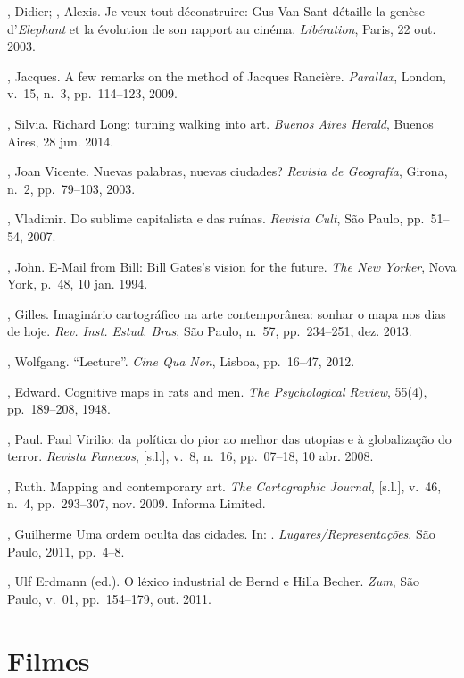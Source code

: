 \begin{bibliohedra}
, Didier; , Alexis. Je veux tout déconstruire: Gus Van Sant
détaille la genèse d'\emph{Elephant} et la évolution de son rapport au
cinéma. \emph{Libération}, Paris, 22 out. 2003.

, Jacques. A few remarks on the method of Jacques Rancière.
\emph{Parallax}, London, v.~15, n.~3, pp.~114--123, 2009. 

, Silvia. Richard Long: turning walking into art.
\emph{Buenos Aires Herald}, Buenos Aires, 28 jun. 2014.

, Joan Vicente. Nuevas palabras, nuevas ciudades? \emph{Revista
de Geografía}, Girona, n.~2, pp.~79--103, 2003.

, Vladimir. Do sublime capitalista e das ruínas. \emph{Revista
Cult}, São Paulo, pp.~51--54, 2007.

, John. E-Mail from Bill: Bill Gates's vision for the future.
\emph{The New Yorker}, Nova York, p.~48, 10 jan. 1994.

, Gilles. Imaginário cartográfico na arte contemporânea:
sonhar o mapa nos dias de hoje. \emph{Rev. Inst. Estud. Bras}, São
Paulo, n.~57, pp.~234--251, dez. 2013.

, Wolfgang. ``Lecture''. \emph{Cine Qua Non}, Lisboa, pp.~16--47,
2012.

, Edward. Cognitive maps in rats and men. \emph{The Psychological Review}, 55(4), pp.~189--208, 1948.

, Paul. Paul Virilio: da política do pior ao melhor das utopias e
à globalização do terror. \emph{Revista Famecos}, {[}s.l.{]}, v.~8, n.~16, pp.~07--18, 10 abr. 2008.

, Ruth. Mapping and contemporary art. \emph{The Cartographic
Journal}, {[}s.l.{]}, v.~46, n.~4, pp.~293--307, nov. 2009. Informa 
Limited.

, Guilherme Uma ordem oculta das cidades. In: .
\emph{Lugares/Representações}. São Paulo, 2011, pp.~4--8.

, Ulf Erdmann (ed.). O léxico industrial de Bernd e Hilla Becher.
\emph{Zum}, São Paulo, v.~01, pp.~154--179, out. 2011.


\pagebreak

\section{Filmes}


\end{bibliohedra}
